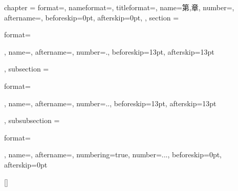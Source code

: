 
\ctexset
{
    chapter =
    {
        format=\centering\sffamily\heiti{},
        nameformat={},
        titleformat={},
        name={第,章},
        number=,
        aftername=\hspace{1em},
        beforeskip=0pt,
        afterskip=0pt,
    },
    section =
    {
        format=\raggedright\sffamily\heiti{},
        name={},
        aftername=\hspace{1em},
        number=\thechapter.,
        beforeskip=13pt,
        afterskip=13pt
    },
    subsection =
    {
        format=\raggedright\sffamily\heiti\fontsize{13pt}{19.5pt}\selectfont,
        name={},
        aftername=\hspace{1em},
        number=\thechapter..,
        beforeskip=13pt,
        afterskip=13pt
    },
    subsubsection =
    {
        format=\raggedright\sffamily\heiti{},
        name={},
        aftername=\hspace{1em},
        numbering=true,
        number=\thechapter...,
        beforeskip=0pt,
        afterskip=0pt
    }
}

{
    [\bibname]{
    }
}{}